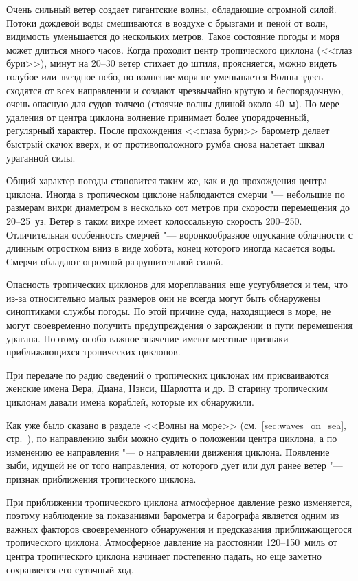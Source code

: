 Очень сильный ветер создает гигантские волны, обладающие огромной
силой. Потоки дождевой воды смешиваются в воздухе с брызгами и пеной
от волн, видимость уменьшается до нескольких метров. Такое состояние
погоды и моря может длиться много часов. Когда проходит центр
тропического циклона (<<глаз бури>>), минут на 20--30 ветер стихает до
штиля, проясняется, можно видеть голубое или звездное небо, но
волнение моря не уменьшается Волны здесь сходятся от всех направлении
и создают чрезвычайно крутую и беспорядочную, очень опасную для судов
толчею (стоячие волны длиной около 40~м). По мере удаления от центра
циклона волнение принимает более упорядоченный, регулярный
характер. После прохождения <<глаза бури>> барометр делает быстрый
скачок вверх, и от противоположного румба снова налетает шквал
ураганной силы.

Общий характер погоды становится таким же, как и до прохождения центра
циклона. Иногда в тропическом циклоне наблюдаются смерчи "--- небольшие
по размерам вихри диаметром в несколько сот метров при скорости
перемещения до 20--25~уз. Ветер в таком вихре имеет колоссальную
скорость 200--250\speedms. Отличительная особенность смерчей "---
воронкообразное опускание облачности с длинным отростком вниз в виде
хобота, конец которого иногда касается воды. Смерчи обладают огромной
разрушительной силой.

Опасность тропических циклонов для мореплавания еще усугубляется и
тем, что из-за относительно малых размеров они не всегда могут быть
обнаружены синоптиками службы погоды. По этой причине суда,
находящиеся в море, не могут своевременно получить предупреждения о
зарождении и пути перемещения урагана. Поэтому особо важное значение
имеют местные признаки приближающихся тропических циклонов.

При передаче по радио сведений о тропических циклонах им присваиваются
женские имена Вера, Диана, Нэнси, Шарлотта и др. В старину тропическим
циклонам давали имена кораблей, которые их обнаружили.

 Как уже было сказано в разделе <<Волны на море>>
(см.~\ref{sec:waves_on_sea}, стр.~\pageref{sec:waves_on_sea}), по
направлению зыби можно судить о положении центра циклона, а по
изменению ее направления "--- о направлении движения
циклона. Появление зыби, идущей не от того направления, от которого
дует или дул ранее ветер "--- признак приближения тропического
циклона.

 При приближении тропического циклона атмосферное давление
резко изменяется, поэтому наблюдение за показаниями барометра и
барографа является одним из важных факторов своевременного обнаружения
и предсказания приближающегося тропического циклона. Атмосферное
давление на расстоянии 120--150~миль от центра тропического циклона
начинает постепенно падать, но еще заметно сохраняется его суточный
ход.

